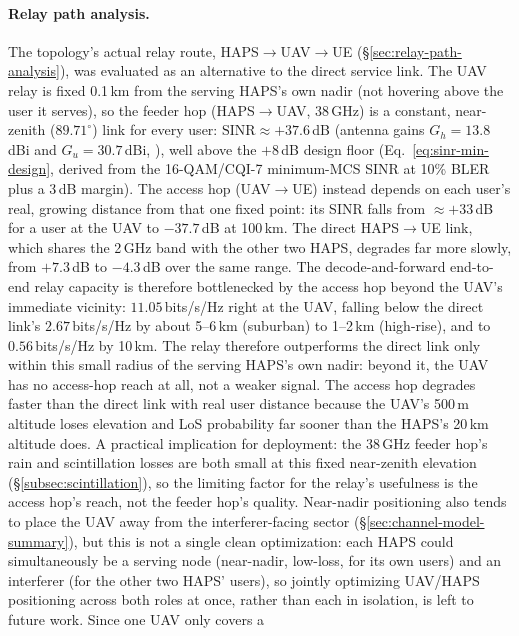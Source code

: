 \documentclass[conference]{IEEEtran}
\begin{document}
\paragraph{Relay path analysis.} The topology's actual relay route,
HAPS$\rightarrow$UAV$\rightarrow$UE (\S\ref{sec:relay-path-analysis}), was
evaluated as an alternative to the direct service link. The UAV relay is fixed 0.1\,km from
the serving HAPS's own nadir (not hovering above the user it serves), so the feeder hop
(HAPS$\rightarrow$UAV, 38\,GHz) is a constant, near-zenith ($89.71^\circ$) link for every
user: $\mathrm{SINR}\approx+37.6$\,dB (antenna gains $G_h=13.8$\,dBi and $G_u=30.7$\,dBi,
\cite{karaman2025haps,anim2021uav}), well above the
$+8$\,dB design floor (Eq.~\eqref{eq:sinr-min-design}, derived from the 16-QAM/CQI-7 minimum-MCS SINR at 10\% BLER~\cite{3gpp_ts38214}
plus a 3\,dB margin). The access hop (UAV$\rightarrow$UE) instead depends on each user's
real, growing distance from that one fixed point: its SINR falls from $\approx+33$\,dB for a
user at the UAV to $-37.7$\,dB at 100\,km. The direct HAPS$\rightarrow$UE link, which shares
the 2\,GHz band with the other two HAPS, degrades far more slowly, from
$+7.3$\,dB to $-4.3$\,dB over the same range. The decode-and-forward end-to-end relay
capacity is therefore bottlenecked by the access hop beyond the UAV's immediate vicinity:
$11.05$\,bits/s/Hz right at the UAV, falling below the direct link's $2.67$\,bits/s/Hz by
about 5--6\,km (suburban) to 1--2\,km (high-rise), and to $0.56$\,bits/s/Hz by 10\,km. The
relay therefore outperforms the direct link only within this small radius of the serving
HAPS's own nadir: beyond it, the UAV has no access-hop reach at all, not a weaker signal.
The access hop degrades faster than the direct link with real user distance because the
UAV's 500\,m altitude loses elevation and LoS probability far sooner than the HAPS's
20\,km altitude does. A practical implication for
deployment: the 38\,GHz feeder hop's rain and scintillation losses are both small at this
fixed near-zenith elevation (\S\ref{subsec:scintillation}), so the limiting factor for the
relay's usefulness is the access hop's reach, not the feeder hop's quality. Near-nadir
positioning also tends to place the UAV away from the interferer-facing
sector (\S\ref{sec:channel-model-summary}), but this is not a single clean
optimization: each HAPS could simultaneously be a serving node (near-nadir,
low-loss, for its own users) and an interferer (for the other two HAPS'
users), so jointly optimizing UAV/HAPS positioning across both roles at
once, rather than each in isolation, is left to future work. Since one UAV only covers a
\end{document}
